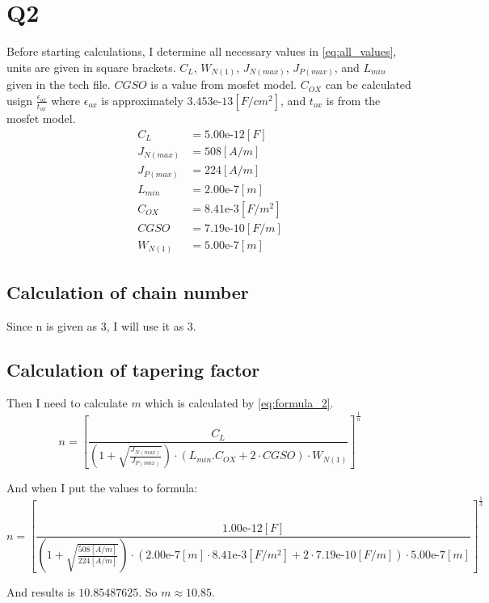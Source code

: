 \documentclass[a4paper,10pt]{article}
\begin{document}
\newpage
\section*{Q2}
Before starting calculations, I determine all necessary values in \autoref{eq:all_values}, units are given in square brackets. $C_L$, $W_{N(1)}$, $J_{N(max)}$, $J_{P(max)}$, and $L_{min}$ given in the tech file. $CGSO$ is a value from mosfet model. $C_{OX}$ can be calculated usign $\frac{\epsilon_{ox}}{t_{ox}}$ where $\epsilon_{ox}$ is approximately $3.453\text{e-}13[F/cm^2]$, and $t_{ox}$ is from the mosfet model.
\begin{equation}\label{eq:all_values}
\begin{split}
 C_L & = 5.00\text{e-}12[F] \\
 J_{N(max)} & = 508[A/m] \\
 J_{P(max)} & = 224[A/m] \\
 L_{min} & = 2.00\text{e-}7[m] \\
 C_{OX} & = 8.41\text{e-}3[F/m^2] \\
 CGSO & = 7.19\text{e-}10[F/m] \\
 W_{N(1)} & = 5.00\text{e-}7[m]
\end{split}
\end{equation}

\subsection*{Calculation of chain number}
Since n is given as 3, I will use it as 3.

\subsection*{Calculation of tapering factor}
Then I need to calculate $m$ which is calculated by \autoref{eq:formula_2}.
\begin{equation}\label{eq:formula_2}
 n= \left[ \frac{C_L}{\left(1+\sqrt{\frac{J_{N(max)}} {J_{P(max)}}}\right)\cdot(L_{min}.C_{OX}+2\cdot CGSO)\cdot W_{N(1)}}\right]^{\frac{1}{n}}
\end{equation}

And when I put the values to formula:
\[
 n=\left[ \frac{1.00\text{e-}12[F]}{\left(1+\sqrt{\frac{508[A/m]}{224[A/m]}}\right)\cdot(2.00\text{e-}7[m]\cdot8.41\text{e-}3[F/m^2]+2\cdot7.19\text{e-}10[F/m])\cdot5.00\text{e-}7[m]}\right]^{\frac{1}{3}}
\]

And results is $10.85487625$. So $m\approx 10.85$.
\end{document}

